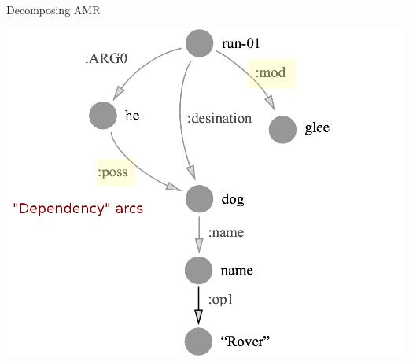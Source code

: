 \documentclass[hyperref]{beamer}
\begin{document}
\begin{frame}[noframenumbering]{Decomposing AMR}
\begin{center}
\includegraphics[scale=0.25]{glee_deps.png}
\end{center}
\end{frame}
\end{document}
